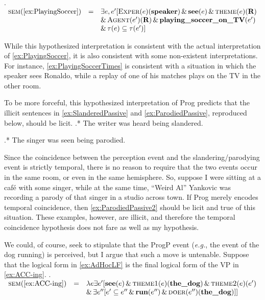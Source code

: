 \documentclass[MilwayThesis]{subfiles}
\begin{document}
\ex.\label{ex:PlayingSoccerTimes} 
$\begin{array}{rcl}
	\textsc{sem}(\cref{ex:PlayingSoccer}) & =  & \exists e, e^{\prime} [\textsc{Exper}(e)(\textbf{speaker}) \,\&\, \textbf{see}(e) \,\&\, \textsc{theme}(e)(\textbf{R})\\
	& & \&\, \textsc{Agent}(e^{\prime})(\textbf{R}) \,\&\, \textbf{playing\_soccer\_on\_TV}(e^{\prime})\\
	& & \&\, \tau(e) \subseteq \tau(e^{\prime})] 
\end{array}$

While this hypothesized interpretation is consistent with the actual interpretation of \cref{ex:PlayingSoccer}, it is also consistent with some non-existent interpretations.
For instance, \cref{ex:PlayingSoccerTimes} is consistent with a situation in which the speaker sees Ronaldo, while a replay of one of his matches plays on the TV in the other room.

To be more forceful, this hypothesized interpretation of Prog predicts that the illicit sentences in \cref{ex:SlanderedPassive} and \cref{ex:ParodiedPassive}, reproduced below, should be licit.
\ex.* The writer was heard being slandered.\label{ex:SlanderedPassive22}

\ex.* The singer was seen being parodied.\label{ex:ParodiedPassive2}

Since the coincidence between the perception event and the slandering/parodying event is strictly temporal, there is no reason to require that the two events occur in the same room, or even in the same hemisphere.
So, suppose I were sitting at a caf\'e with some singer, while at the same time, ``Weird Al'' Yankovic was recording a parody of that singer in a studio across town.
If Prog merely encodes temporal coincidence, then \cref{ex:ParodiedPassive2} should be licit and true of this situation.
These examples, however, are illicit, and therefore the temporal coincidence hypothesis does not fare as well as my hypothesis.

We could, of course, seek to stipulate that the ProgP event (\textit{e.g.}, the event of the dog running) is perceived, but I argue that such a move is untenable.
Suppose that the logical form in \cref{ex:AdHocLF} is the final logical form of the VP in \cref{ex:ACC-ing}.
\ex.\label{ex:AdHocLF}
$
\begin{array}[t]{rcl}
	\textsc{sem}(\text{\cref{ex:ACC-ing}}) & = & \lambda e \exists e^{\prime} [ \textbf{see}(e) \,\&\, \textsc{theme1}(e)(\textbf{the\_dog}) \,\&\, \textsc{theme2}(e)(e^{\prime})\\
	& & \&\, \exists e^{\prime\prime}[ e^{\prime} \subseteq e^{\prime\prime} \,\&\, \textbf{run}(e^{\prime\prime}) \,\&\, \textsc{doer}(e^{\prime\prime})(\textbf{the\_dog})]]
\end{array}
$
\end{document}
